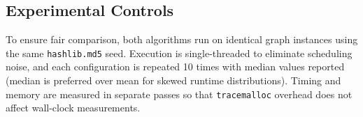 \subsection{Experimental Controls}

To ensure fair comparison, both algorithms run on identical graph instances using the same \texttt{hashlib.md5} seed. Execution is single-threaded to eliminate scheduling noise, and each configuration is repeated 10 times with median values reported (median is preferred over mean for skewed runtime distributions). Timing and memory are measured in separate passes so that \texttt{tracemalloc} overhead does not affect wall-clock measurements.
